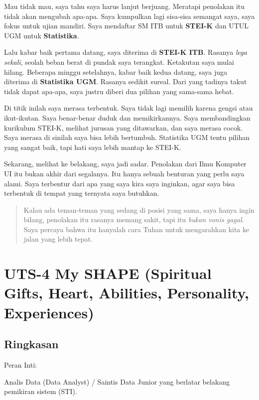 \documentclass[
  letterpaper,
  DIV=11,
  numbers=noendperiod]{scrreprt}
\begin{document}
Mau tidak mau, saya tahu saya harus lanjut berjuang. Meratapi penolakan
itu tidak akan mengubah apa-apa. Saya kumpulkan lagi sisa-sisa semangat
saya, saya fokus untuk ujian mandiri. Saya mendaftar SM ITB untuk
\textbf{STEI-K} dan UTUL UGM untuk \textbf{Statistika}.

Lalu kabar baik pertama datang, saya diterima di \textbf{STEI-K ITB}.
Rasanya \emph{lega sekali}, seolah beban berat di pundak saya terangkat.
Ketakutan saya mulai hilang. Beberapa minggu setelahnya, kabar baik
kedua datang, saya juga diterima di \textbf{Statistika UGM}. Rasanya
sedikit sureal. Dari yang tadinya takut tidak dapat apa-apa, saya justru
diberi dua pilihan yang sama-sama hebat.

Di titik inilah saya merasa terbentuk. Saya tidak lagi memilih karena
gengsi atau ikut-ikutan. Saya benar-benar duduk dan memikirkannya. Saya
membandingkan kurikulum STEI-K, melihat jurusan yang ditawarkan, dan
saya merasa cocok. Saya merasa di sinilah saya bisa lebih bertumbuh.
Statistika UGM tentu pilihan yang sangat baik, tapi hati saya lebih
mantap ke STEI-K.

Sekarang, melihat ke belakang, saya jadi sadar. Penolakan dari Ilmu
Komputer UI itu bukan akhir dari segalanya. Itu hanya sebuah benturan
yang perlu saya alami. Saya terbentur dari apa yang saya kira saya
inginkan, agar saya bisa terbentuk di tempat yang ternyata saya
butuhkan.

\begin{quote}
Kalau ada teman-teman yang sedang di posisi yang sama, saya hanya ingin
bilang, penolakan itu rasanya memang sakit, tapi itu \emph{bukan vonis
gagal}. Saya percaya bahwa itu hanyalah cara Tuhan untuk mengarahkan
kita ke jalan yang lebih tepat.
\end{quote}


\chapter{UTS-4 My SHAPE (Spiritual Gifts, Heart, Abilities, Personality,
Experiences)}\label{uts-4-my-shape-spiritual-gifts-heart-abilities-personality-experiences}

\section{Ringkasan}\label{ringkasan}

Peran Inti:

Analis Data (Data Analyst) / Saintis Data Junior yang berlatar belakang
pemikiran sistem (STI).
\end{document}
